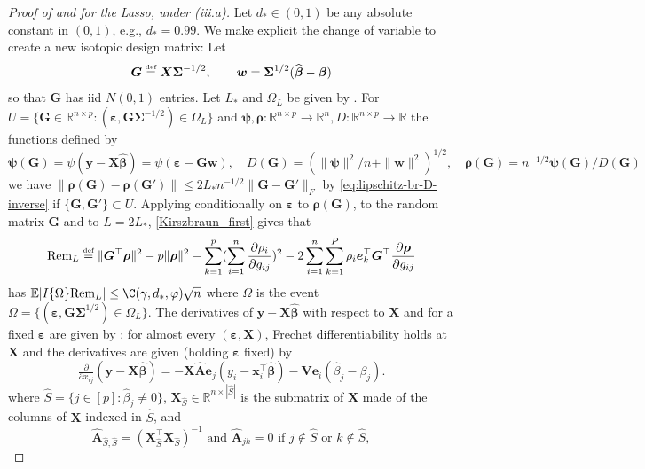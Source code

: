 \documentclass[11pt]{amsart}
\numberwithin{equation}{section}
\numberwithin{equation}{section}
\def\real{{\mathbb{R}}}
\def\R{{\real}}
\def\E{{\mathbb{E}}}
\def\Rem{\hbox{\rm Rem}}
\def\mathbold{\boldsymbol} %
\def\bA{\mathbold{A}}\def\calA{{\cal A}}\def\scrA{{\mathscr A}}\def\Ahat{\widehat{A}}\def\Atil{{\widetilde A}}
\def\hbA{{\widehat{\bA}}}\def\tbA{{\widetilde{\bA}}}
\def\bG{\mathbold{G}}\def\calG{{\cal G}}\def\scrG{{\mathscr G}}\def\Ghat{\widehat{G}}\def\Gtil{{\widetilde G}}
\def\be{\mathbold{e}}
\def\bV{\mathbold{V}}\def\hbV{{\widehat{\bV}}}\def\tbV{{\widetilde{\bV}}}
\def\bw{\mathbold{w}}\def\what{\widehat{w}}\def\wtil{\widetilde{w}}\def\wbar{{\overline w}}
\def\bx{\mathbold{x}}\def\xhat{\widehat{x}}\def\xtil{\widetilde{x}}\def\xbar{{\overline x}}\def\vbx{{\bf x}}
\def\bX{\mathbold{X}}\def\hbX{{\widehat{\bX}}}\def\tbX{{\widetilde{\bX}}}\def\bXbar{{\overline \bX}}
\def\by{\mathbold{y}}\def\yhat{\widehat{y}}\def\ytil{\widetilde{y}}\def\ybar{{\overline y}}\def\vby{{\bf y}}
\def\bbeta{\mathbold{\beta}}\def\betahat{\widehat{\beta}}\def\hbeta{\widehat{\beta}}
\def\hbbeta{{{\widehat{\bbeta}}}}
\def\ep{\varepsilon}\def\eps{\epsilon}\def\veps{\varepsilon}
\def\bep{ {\mathbold{\ep} }}
\def\brho{\mathbold{\rho}}\def\rhohat{\widehat{\rho}}\def\hrho{\widehat{\rho}}
\def\bSigma{\mathbold{\Sigma}}\def\hbSigma{{\widehat{\bSigma}}}
\def\bpsi{\mathbold{\psi}}\def\psihat{\widehat{\psi}}\def\hpsi{\widehat{\psi}}
\def\calG{{\cal G}}
\def\defas{\stackrel{\text{\tiny def}}{=}}
\begin{document}
\begin{proof}[Proof of  and 
    for the Lasso, under (iii.a)]
Let $d_*\in (0,1)$ be any absolute constant in $(0,1)$, e.g., $d_*=0.99$.
We make explicit the change of variable to create a new isotopic
design matrix:
Let 
\begin{equation}
  \bG\defas \bX\bSigma^{-1/2}  ,
  \qquad
  \bw=\bSigma^{1/2}(\hbbeta-\bbeta)
  \label{defw}
\end{equation}
so that $\bG$ has iid $N(0,1)$ entries.
Let $L_*$ and $\Omega_L$ be given by .
For $U=\{\bG\in\R^{n\times p}: (\bep,\bG\bSigma^{-1/2})\in\Omega_L\}$
and $\bpsi,\brho:\R^{n\times p}\to \R^n,D:\R^{n\times p}\to \R$ the
functions defined by
\begin{equation}
    \label{eq_bpsi-D-brho-Lasso}
\bpsi(\bG) = \psi(\by-\bX\hbbeta) = \psi(\bep - \bG\bw),
\quad
D(\bG) = (\|\bpsi\|^2/n + \|\bw\|^2)^{1/2},
\quad
\brho(\bG) = n^{-1/2}\bpsi(\bG) / D(\bG)
\end{equation}
we have $\|\brho(\bG)-\brho(\bG')\|
\le 2L_* n^{-1/2}\|\bG-\bG'\|_F$ by
\eqref{eq:lipschitz-br-D-inverse} if $\{\bG,\bG'\}\subset U$.
Applying 
conditionally on $\bep$ to $\brho(\bG)$, to the random matrix $\bG$ and to $L=2L_*$, 
\eqref{Kirszbraun_first} gives that
\begin{equation}
\Rem_L \defas
\|\bG^\top\brho\|^2-p\|\brho\|^2
-\sum_{k=1}^p(\sum_{i=1}^n\frac{\partial \rho_i}{\partial g_{ij}})^2
- 2 \sum_{i=1}^n\sum_{k=1}^P \rho_i \be_k^\top\bG^\top \frac{\partial \brho}{\partial g_{ij}}
\label{Rem_L}
\end{equation}
has $\E|I\{\Omega\}\Rem_L|\le \C(\gamma,d_*,\varphi) \sqrt n$
where $\Omega$ is the event $\Omega=\{(\bep,\bG\bSigma^{1/2})\in\Omega_L\}$.
The derivatives of $\by-\bX\hbbeta$ with respect to $\bX$ and 
for a fixed $\bep$ are given by
\cite[Proposition 4.1]{bellec_zhang2019second_poincare}:
for almost every $(\bep,\bX)$, Frechet differentiability holds at $\bX$
and the derivatives are given (holding $\bep$ fixed) by
$$
\tfrac{\partial}{\partial x_{ij}}(\by-\bX\hbbeta)
= - \bX\hbA\be_j(y_i-\bx_i^\top\hbbeta) - \bV\be_i (\hbeta_j-\beta_j).
$$
where $\hat S = \{j\in[p]: \hbeta_j\ne 0\}$,
$\bX_{\hat S}\in\R^{n\times |\hat S|}$
is the submatrix of $\bX$ made of the columns of $\bX$ indexed in $\hat S$,
and
\begin{equation}
\hbA_{\hat S,\hat S} = (\bX_{\hat S}^\top\bX_{\hat S})^{-1}
\text{ and }
\hbA_{jk} = 0 \text{ if }j\notin \hat S \text{ or } k\notin \hat S,

\end{equation}
\end{proof}
\end{document}
